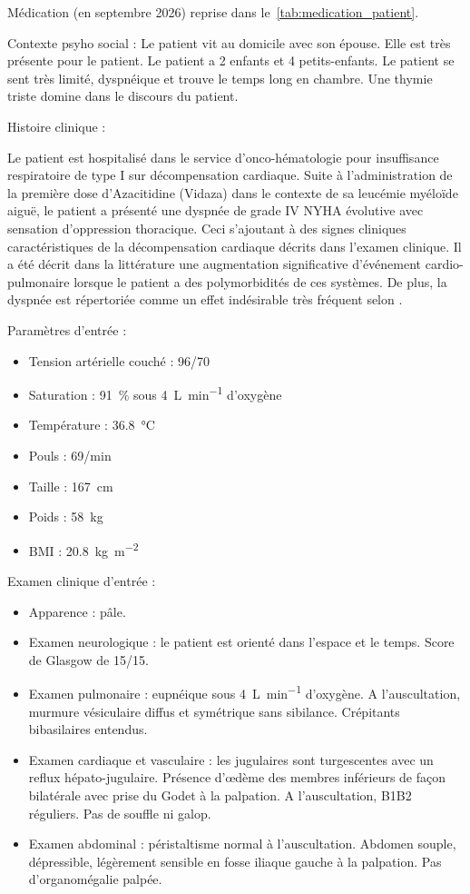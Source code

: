 Médication (en septembre 2026) reprise dans le~\cref{tab:medication_patient}.



Contexte psyho social : 
Le patient vit au domicile avec son épouse. Elle est très présente pour le patient. Le patient a 2 enfants et 4 petits-enfants. 
Le patient se sent très limité, dyspnéique et trouve le temps long en chambre.  Une thymie triste domine dans le discours du patient. 

Histoire clinique :

Le patient est hospitalisé dans le service d’onco-hématologie pour insuffisance respiratoire de type I sur décompensation cardiaque. Suite à l’administration de la première dose d’Azacitidine (Vidaza) dans le contexte de sa leucémie myéloïde aiguë, le patient a présenté une dyspnée de grade IV NYHA évolutive avec sensation d’oppression thoracique. Ceci s’ajoutant à des signes cliniques caractéristiques de la décompensation cardiaque décrits dans l’examen clinique. Il a été décrit dans la littérature une augmentation significative d’événement cardio-pulmonaire lorsque le patient a des polymorbidités de ces systèmes. De plus, la dyspnée est répertoriée comme un effet indésirable très fréquent selon \textcite{ema_azacitidine_accord}.

Paramètres d’entrée :
\begin{itemize}[compact, label=\textbullet]
    \item Tension artérielle couché : 96/70
    \item Saturation : \qty{91}{\percent} sous \qty{4}{\L\per\minute} d’oxygène
    \item Température : \qty{36.8}{\degreeCelsius}
    \item Pouls : 69/min
    \item Taille : \qty{167}{\cm}
    \item Poids : \qty{58}{\kg}
    \item BMI : \qty{20.8}{\kg\per\square\metre}
    \end{itemize}

Examen clinique d’entrée :
    \begin{itemize}[compact, label=\textbullet]
    \item Apparence : pâle.
    \item Examen neurologique : le patient est orienté dans l’espace et le temps. Score de Glasgow de 15/15.
    \item Examen pulmonaire : eupnéique sous \qty{4}{\L\per\minute} d’oxygène. A l’auscultation, murmure vésiculaire diffus et symétrique sans sibilance. Crépitants bibasilaires entendus.
    \item Examen cardiaque et vasculaire : les jugulaires sont turgescentes avec un reflux hépato-jugulaire. Présence d’œdème des membres inférieurs de façon bilatérale avec prise du Godet à la palpation. A l’auscultation, B1B2 réguliers. Pas de souffle ni galop.
    \item Examen abdominal : péristaltisme normal à l’auscultation. Abdomen souple, dépressible, légèrement sensible en fosse iliaque gauche à la palpation. Pas d’organomégalie palpée.
    \end{itemize}


